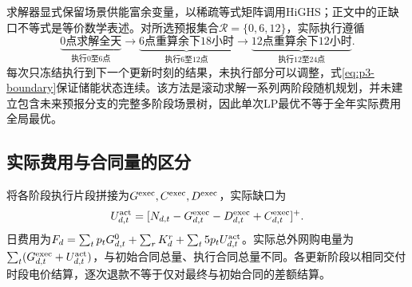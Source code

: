 求解器显式保留场景供能富余变量，以稀疏等式矩阵调用HiGHS；正文中的正缺口不等式是等价数学表述。对所选预报集合$\mathcal R=\{0,6,12\}$，实际执行遵循
\begin{equation}
\underbrace{\text{0点求解全天}}_{\text{执行0至6点}}
\longrightarrow
\underbrace{\text{6点重算余下18小时}}_{\text{执行6至12点}}
\longrightarrow
\underbrace{\text{12点重算余下12小时}}_{\text{执行12至24点}}.
\end{equation}
每次只冻结执行到下一个更新时刻的结果，未执行部分可以调整，式\eqref{eq:p3-boundary}保证储能状态连续。该方法是滚动求解一系列两阶段随机规划，并未建立包含未来预报分支的完整多阶段场景树，因此单次LP最优不等于全年实际费用全局最优。

\subsection{实际费用与合同量的区分}
将各阶段执行片段拼接为$G^{\rm exec},C^{\rm exec},D^{\rm exec}$，实际缺口为
\begin{equation}U_{d,t}^{\rm act}=[N_{d,t}-G_{d,t}^{\rm exec}-D_{d,t}^{\rm exec}+C_{d,t}^{\rm exec}]^+.\end{equation}
日费用为$F_d=\sum_tp_tG_{d,t}^0+\sum_rK_d^r+\sum_t5p_tU_{d,t}^{\rm act}$。实际总外网购电量为$\sum_t(G_{d,t}^{\rm exec}+U_{d,t}^{\rm act})$，与初始合同总量、执行合同总量不同。各更新阶段以相同交付时段电价结算，逐次退款不等于仅对最终与初始合同的差额结算。
